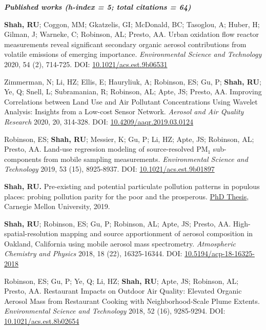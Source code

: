 \documentclass{article}
\begin{document}
\hrulefill
\textit{\textbf{  Published works (h-index = 5; total citations = 64)  }}
\hrulefill
\begin{etaremune}
\item \textbf{Shah, RU}; Coggon, MM; Gkatzelis, GI; McDonald, BC; Tasoglou, A; Huber, H; Gilman, J; Warneke, C; Robinson, AL; Presto, AA. Urban oxidation flow reactor measurements reveal significant secondary organic aerosol contributions from volatile emissions of emerging importance. \textit{Environmental Science and Technology} 2020, 54 (2), 714-725. DOI: \href{https://doi.org/10.1021/acs.est.9b06531}{10.1021/acs.est.9b06531}
\item Zimmerman, N; Li, HZ; Ellis, E; Hauryliuk, A; Robinson, ES; Gu, P; \textbf{Shah, RU}; Ye, Q; Snell, L; Subramanian, R; Robinson, AL; Apte, JS; Presto, AA. Improving Correlations between Land Use and Air Pollutant Concentrations Using Wavelet Analysis: Insights from a Low-cost Sensor Network. \textit{Aerosol and Air Quality Research} 2020, 20, 314-328. DOI: \href{http://www.aaqr.org/doi/10.4209/aaqr.2019.03.0124}{10.4209/aaqr.2019.03.0124}
\item Robinson, ES; \textbf{Shah, RU}; Messier, K; Gu, P; Li, HZ; Apte, JS; Robinson, AL; Presto, AA. Land-use regression modeling of source-resolved PM$_1$ sub-components from mobile sampling measurements. \textit{Environmental Science and Technology} 2019, 53 (15), 8925-8937. DOI: \href{https://doi.org/10.1021/acs.est.9b01897}{10.1021/acs.est.9b01897}
\item \textbf{Shah, RU.} Pre-existing and potential particulate pollution patterns in populous places: probing pollution parity for the poor and the prosperous. \href{https://search.proquest.com/openview/a52fa8ba9f1b4ffe2e6e7b09ca6e2397/1.pdf?pq-origsite=gscholar&cbl=18750&diss=y}{PhD Thesis}, Carnegie Mellon University, 2019.
\item \textbf{Shah, RU}; Robinson, ES; Gu, P; Robinson, AL; Apte, JS; Presto, AA. High-spatial-resolution mapping and source apportionment of aerosol composition in Oakland, California using mobile aerosol mass spectrometry. \textit{Atmospheric Chemistry and Physics} 2018, 18 (22), 16325-16344. DOI: \href{https://www.atmos-chem-phys.net/18/16325/2018/}{10.5194/acp-18-16325-2018}
\item Robinson, ES; Gu, P; Ye, Q; Li, HZ; \textbf{Shah, RU}; Apte, JS; Robinson, AL; Presto, AA. Restaurant Impacts on Outdoor Air Quality: Elevated Organic Aerosol Mass from Restaurant Cooking with Neighborhood-Scale Plume Extents. \textit{Environmental Science and Technology} 2018, 52 (16), 9285-9294. DOI: \href{http://pubs.acs.org/doi/10.1021/acs.est.8b02654}{10.1021/acs.est.8b02654}

\end{etaremune}
\end{document}
